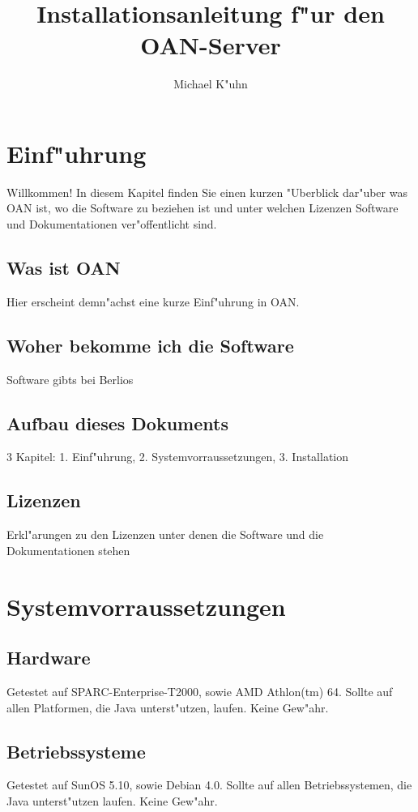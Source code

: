 \documentclass[a4paper,12pt]{scrreprt}
\title{Installationsanleitung f"ur den OAN-Server}
\author{Michael K"uhn}
\begin{document}
\maketitle
\tableofcontents

\begin{abstract}
\end{abstract}

\chapter{Einf"uhrung}
Willkommen! In diesem Kapitel finden Sie einen kurzen "Uberblick dar"uber was OAN ist, wo die Software zu beziehen ist und unter welchen Lizenzen Software und Dokumentationen ver"offentlicht sind.
\section{Was ist OAN}
Hier erscheint demn"achst eine kurze Einf"uhrung in OAN.
\section{Woher bekomme ich die Software}
Software gibts bei Berlios
\section{Aufbau dieses Dokuments}
3 Kapitel: 1. Einf"uhrung, 2. Systemvorraussetzungen, 3. Installation
\section{Lizenzen}
Erkl"arungen zu den Lizenzen unter denen die Software und die Dokumentationen stehen
\chapter{Systemvorraussetzungen}
\section{Hardware}
Getestet auf SPARC-Enterprise-T2000, sowie AMD Athlon(tm) 64.
Sollte auf allen Platformen, die Java unterst"utzen, laufen. Keine Gew"ahr.
\section{Betriebssysteme}
Getestet auf SunOS 5.10, sowie Debian 4.0. Sollte auf allen Betriebssystemen, die Java unterst"utzen laufen. Keine Gew"ahr.
\end{document}

